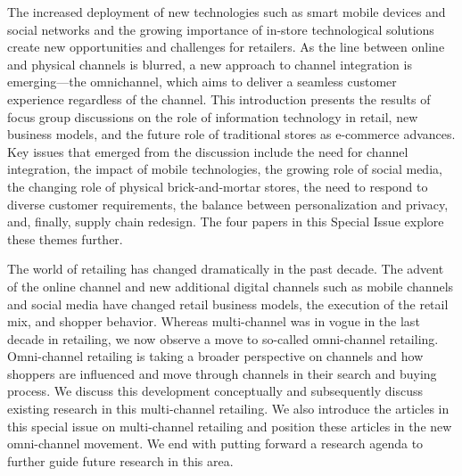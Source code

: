 \citep{piotrowicz2014introduction}

The increased deployment of new technologies such as smart mobile devices and social networks and the growing importance of in-store technological solutions create new opportunities and challenges for retailers. As the line between online and physical channels is blurred, a new approach to channel integration is emerging—the omnichannel, which aims to deliver a seamless customer experience regardless of the channel. This introduction presents the results of focus group discussions on the role of information technology in retail, new business models, and the future role of traditional stores as e-commerce advances. Key issues that emerged from the discussion include the need for channel integration, the impact of mobile technologies, the growing role of social media, the changing role of physical brick-and-mortar stores, the need to respond to diverse customer requirements, the balance between personalization and privacy, and, finally, supply chain redesign. The four papers in this Special Issue explore these themes further.

\citep{verhoef2015multi}

The world of retailing has changed dramatically in the past decade. The advent of the online channel and new additional digital channels such as mobile channels and social media have changed retail business models, the execution of the retail mix, and shopper behavior. Whereas multi-channel was in vogue in the last decade in retailing, we now observe a move to so-called omni-channel retailing. Omni-channel retailing is taking a broader perspective on channels and how shoppers are influenced and move through channels in their search and buying process. We discuss this development conceptually and subsequently discuss existing research in this multi-channel retailing. We also introduce the articles in this special issue on multi-channel retailing and position these articles in the new omni-channel movement. We end with putting forward a research agenda to further guide future research in this area.